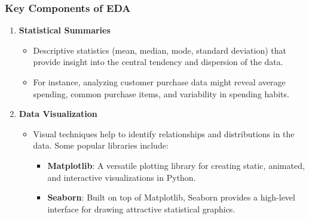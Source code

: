 \documentclass{beamer}
\begin{document}
\begin{frame}
    \frametitle{Key Components of EDA}
    \begin{enumerate}
        \item \textbf{Statistical Summaries}
        \begin{itemize}
            \item Descriptive statistics (mean, median, mode, standard deviation) that provide insight into the central tendency and dispersion of the data.
            \item For instance, analyzing customer purchase data might reveal average spending, common purchase items, and variability in spending habits.
        \end{itemize}

        \item \textbf{Data Visualization}
        \begin{itemize}
            \item Visual techniques help to identify relationships and distributions in the data. Some popular libraries include:
            \begin{itemize}
                \item \textbf{Matplotlib}: A versatile plotting library for creating static, animated, and interactive visualizations in Python.
                \item \textbf{Seaborn}: Built on top of Matplotlib, Seaborn provides a high-level interface for drawing attractive statistical graphics.
            \end{itemize}
        \end{itemize}
    \end{enumerate}
\end{frame}
\end{document}
